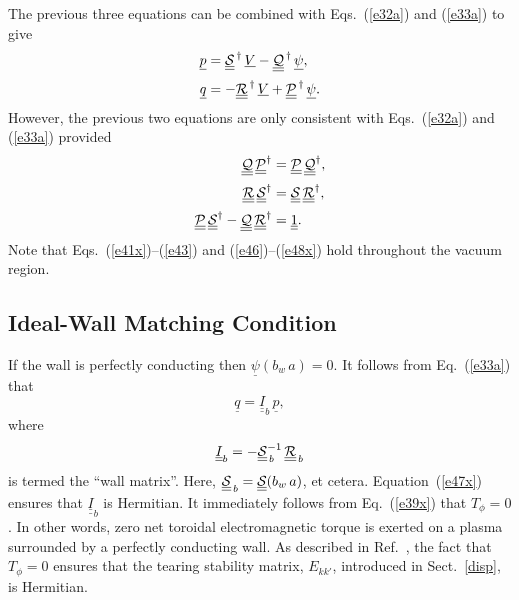 \documentclass[12pt,prb,aps]{revtex4-1}
\begin{document}
The previous three equations can be combined with Eqs.~(\ref{e32a}) and (\ref{e33a}) to give 
\begin{align}
\underline{p} &= \underline{\underline{\cal S}}^{\,\dag} \,\underline{V} - \underline{\underline{\cal Q}}^{\,\dag}\,\underline{\psi},\\[0.5ex]
\underline{q} &= -\underline{\underline{\cal R}}^{\,\dag} \,\underline{V} + \underline{\underline{\cal P}}^{\,\dag}\,\underline{\psi}.
\end{align}
However, the previous two equations are only consistent with Eqs.~(\ref{e32a}) and (\ref{e33a}) provided 
\begin{align}\label{e46}
\underline{\underline{\cal Q}}\,\underline{\underline{\cal P}}^\dag&= \underline{\underline{\cal P}}\,\underline{\underline{\cal Q}}^\dag,\\[0.5ex]
\underline{\underline{\cal R}}\,\underline{\underline{\cal S}}^\dag&= \underline{\underline{\cal S}}\,\underline{\underline{\cal R}}^\dag,\label{e47x}\\[0.5ex]
\underline{\underline{\cal P}}\,\underline{\underline{\cal S}}^{\dag}- \underline{\underline{\cal Q}}\,\underline{\underline{\cal R}}^{\dag}&=\underline{\underline{1}}.\label{e48x}
\end{align}
Note that Eqs.~(\ref{e41x})--(\ref{e43}) and (\ref{e46})--(\ref{e48x}) hold throughout the vacuum region. 

\subsection{Ideal-Wall Matching Condition}
If the wall is perfectly conducting then  $\underline{\psi}(b_w\,a)=0$. 
It follows from Eq.~(\ref{e33a}) that
\begin{equation}
\underline{q} = \underline{\underline{I}}_b\,\underline{p},
\end{equation}
where
\begin{equation}
 \underline{\underline{I}}_b=- \underline{\underline{\cal S}}_{\,b}^{-1}\,\underline{\underline{\cal R}}_{\,b}
 \end{equation}
 is termed the ``wall matrix''.
 Here, $\underline{\underline{\cal S}}_{\,b}= \underline{\underline{\cal S}}(b_w\,a)$, et cetera. Equation~(\ref{e47x}) ensures that $ \underline{\underline{I}}_b$
 is Hermitian. It immediately follows from Eq.~(\ref{e39x}) that $T_\phi=0$. In other words, zero net toroidal electromagnetic torque is exerted on a plasma
 surrounded by a perfectly conducting wall. As described in Ref.~, the fact that $T_\phi=0$ ensures that the tearing stability matrix, $E_{kk'}$, introduced in
 Sect.~\ref{disp}, is Hermitian. 
 
\end{document}
